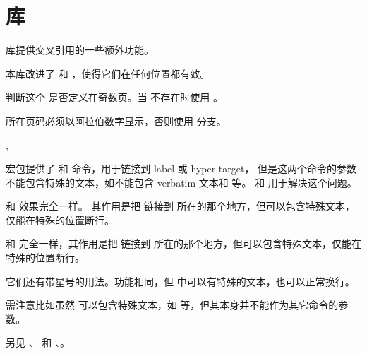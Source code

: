 \documentclass[twoside]{book}
\begin{document}
\section{库}\label{sec:lib-ref}

 库提供交叉引用的一些额外功能。

本库改进了  和 ，使得它们在任何位置都有效。

\begin{function}{\ifLabelOdd}
  \begin{syntax}
    \V\ifLabelOdd {}  
  \end{syntax}
判断这个  是否定义在奇数页。当  不存在时使用 。

 所在页码必须以阿拉伯数字显示，否则使用  分支。
\end{function}

\begin{function}{\HyperRef,\HyperLink}
  \begin{syntax}
    \V\HyperRef   {} 
    \V\HyperRef *  
    \V\HyperLink   {} 
    \V\HyperLink *  
  \end{syntax}
 宏包提供了  和  命令，用于链接到 label 或 hyper target，
但是这两个命令的参数不能包含特殊的文本，如不能包含 verbatim 文本和  等。
 和  用于解决这个问题。

 和  效果完全一样。
其作用是把  链接到  所在的那个地方，但可以包含特殊文本，仅能在特殊的位置断行。

 和 
完全一样，其作用是把  链接到  所在的那个地方，但可以包含特殊文本，仅能在特殊的位置断行。

它们还有带星号的用法。功能相同，但  中可以有特殊的文本，也可以正常换行。

需注意比如虽然  可以包含特殊文本，如  等，但其本身并不能作为其它命令的参数。

另见 、 和 
、。
\end{function}
\end{document}
